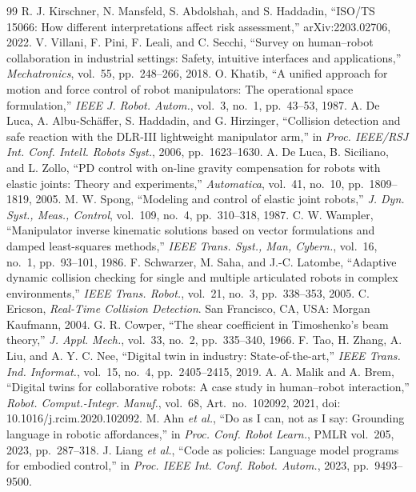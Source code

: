 \documentclass[journal]{IEEEtran}
\begin{document}
\begin{thebibliography}{99}
 R. J. Kirschner, N. Mansfeld, S. Abdolshah, and S. Haddadin, ``ISO/TS 15066: How different interpretations affect risk assessment,'' arXiv:2203.02706, 2022.
 V. Villani, F. Pini, F. Leali, and C. Secchi, ``Survey on human--robot collaboration in industrial settings: Safety, intuitive interfaces and applications,'' \emph{Mechatronics}, vol.~55, pp.~248--266, 2018.
 O. Khatib, ``A unified approach for motion and force control of robot manipulators: The operational space formulation,'' \emph{IEEE J. Robot. Autom.}, vol.~3, no.~1, pp.~43--53, 1987.
 A. De Luca, A. Albu-Sch\"affer, S. Haddadin, and G. Hirzinger, ``Collision detection and safe reaction with the DLR-III lightweight manipulator arm,'' in \emph{Proc. IEEE/RSJ Int. Conf. Intell. Robots Syst.}, 2006, pp.~1623--1630.
 A. De Luca, B. Siciliano, and L. Zollo, ``PD control with on-line gravity compensation for robots with elastic joints: Theory and experiments,'' \emph{Automatica}, vol.~41, no.~10, pp.~1809--1819, 2005.
 M. W. Spong, ``Modeling and control of elastic joint robots,'' \emph{J. Dyn. Syst., Meas., Control}, vol.~109, no.~4, pp.~310--318, 1987.
 C. W. Wampler, ``Manipulator inverse kinematic solutions based on vector formulations and damped least-squares methods,'' \emph{IEEE Trans. Syst., Man, Cybern.}, vol.~16, no.~1, pp.~93--101, 1986.
 F. Schwarzer, M. Saha, and J.-C. Latombe, ``Adaptive dynamic collision checking for single and multiple articulated robots in complex environments,'' \emph{IEEE Trans. Robot.}, vol.~21, no.~3, pp.~338--353, 2005.
 C. Ericson, \emph{Real-Time Collision Detection}. San Francisco, CA, USA: Morgan Kaufmann, 2004.
 G. R. Cowper, ``The shear coefficient in Timoshenko's beam theory,'' \emph{J. Appl. Mech.}, vol.~33, no.~2, pp.~335--340, 1966.
 F. Tao, H. Zhang, A. Liu, and A. Y. C. Nee, ``Digital twin in industry: State-of-the-art,'' \emph{IEEE Trans. Ind. Informat.}, vol.~15, no.~4, pp.~2405--2415, 2019.
 A. A. Malik and A. Brem, ``Digital twins for collaborative robots: A case study in human--robot interaction,'' \emph{Robot. Comput.-Integr. Manuf.}, vol.~68, Art.~no.~102092, 2021, doi: 10.1016/j.rcim.2020.102092.
 M. Ahn \emph{et al.}, ``Do as I can, not as I say: Grounding language in robotic affordances,'' in \emph{Proc. Conf. Robot Learn.}, PMLR vol.~205, 2023, pp.~287--318.
 J. Liang \emph{et al.}, ``Code as policies: Language model programs for embodied control,'' in \emph{Proc. IEEE Int. Conf. Robot. Autom.}, 2023, pp.~9493--9500.

\end{thebibliography}
\end{document}

